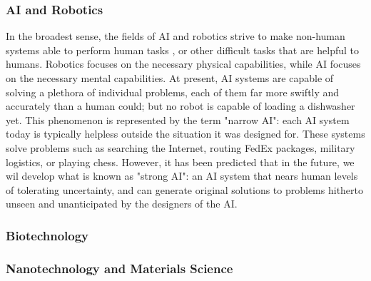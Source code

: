 \subsubsection{AI and Robotics}


In the broadest sense, the fields of AI and robotics strive to make non-human systems able to perform human tasks%
, or other difficult tasks that are helpful to humans. Robotics focuses on the necessary physical capabilities, while AI focuses on the necessary mental capabilities. At present, AI systems are capable of solving a plethora of individual problems, each of them far more swiftly and accurately than a human could; but no robot is capable of loading a dishwasher yet.
This phenomenon is represented by the term "narrow AI": each AI system today is typically helpless outside the situation it was designed for. These systems solve problems such as searching the Internet, routing FedEx packages, military logistics, or playing chess. However, it has been predicted that in the future, we wil develop what is known as "strong AI": an AI system that nears human levels of tolerating uncertainty, and can generate original solutions to problems hitherto unseen and unanticipated by the designers of the AI.

\subsubsection{Biotechnology}



\subsubsection{Nanotechnology and Materials Science}



